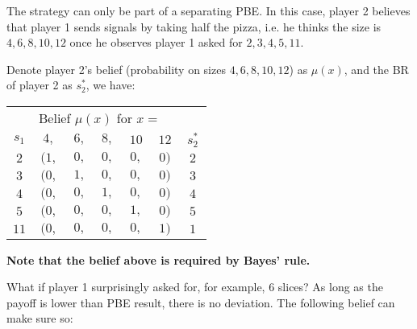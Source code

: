 \documentclass{article}
\begin{document}
\begin{mdframed}[backgroundcolor=blue!20,linecolor=white]

The strategy can only be part of a separating PBE. In this case, player 2 believes
that player 1 sends signals by taking half the pizza, i.e. he thinks the size is $4,6,8,10,12$ once he observes player 1 asked for $2,3,4,5,11$.

\medskip 

Denote player 2's belief (probability on sizes $4, 6, 8, 10, 12$) as $\mu(x)$, and the BR of player 2 as $s_2^*$, we have:

\begin{center}
\begin{tabular}{|c|ccccc|c|}
\multicolumn{1}{c}{} & \multicolumn{6}{c}{Belief $\mu(x)$ for $x = \quad  \quad  \quad$}   \\
$s_1$ & $4,$ & $6,$ & $8,$ & $10$ & $12$ & $s_2^*$  \\   \cline{1-7} 
$2$ & $(1,$ & $0,$ & $0,$ & $0,$ & $0)$ & $2$ \\   
$3$ & $(0,$ & $1,$ & $0,$ & $0,$ & $0)$ & $3$ \\   
$4$ & $(0,$ & $0,$ & $1,$ & $0,$ & $0)$ & $4$ \\   
$5$ & $(0,$ & $0,$ & $0,$ & $1,$ & $0)$ & $5$ \\   
$11$& $(0,$ & $0,$ & $0,$ & $0,$ & $1)$ & $1$ \\   
\hline 
\end{tabular}
\end{center}
\textbf{Note that the belief above is required by Bayes' rule.}

\medskip

What if player 1 surprisingly asked for, for example, 6 slices? As long as the payoff is lower than PBE result, there is no deviation. The following belief can make sure so:


\end{mdframed}
\end{document}
